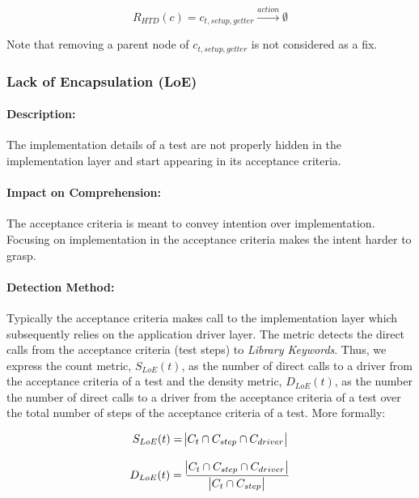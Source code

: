 \begin{equation*}
    R_{HTD}(c) = c_{t, setup, getter} \xrightarrow{action}  \emptyset
\end{equation*}

Note that removing a parent node of $c_{t, setup, getter}$ is not considered as a fix.

\subsubsection{Lack of Encapsulation (LoE)}

\paragraph{Description:}

The implementation details of a test are not properly hidden in the implementation layer and start appearing in its acceptance criteria.

\paragraph{Impact on Comprehension:} 

The acceptance criteria is meant to convey intention over implementation. Focusing on implementation in the acceptance criteria makes the intent harder to grasp.

\paragraph{Detection Method:}

Typically the acceptance criteria makes call to the implementation layer which subsequently relies on the application driver layer. The metric detects the direct calls from the acceptance criteria (test steps) to \emph{Library Keywords}. Thus, we express the count metric, $S_{LoE}(t)$, as the number of direct calls to a driver from the acceptance criteria of a test and the density metric, $D_{LoE}(t)$, as the number the number of direct calls to a driver from the acceptance criteria of a test over the total number of steps of the acceptance criteria of a test. More formally:

\begin{equation*}
    S_{LoE}(t) = \abs{C_{t} \cap C_{step} \cap C_{driver}}
\end{equation*}

\begin{equation*}
    D_{LoE}(t) = \frac{\abs{C_{t} \cap C_{step} \cap C_{driver}}}{\abs{C_{t} \cap C_{step}}}
\end{equation*}

